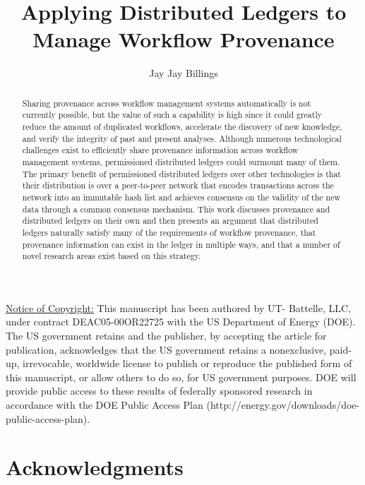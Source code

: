 \documentclass[sigconf]{acmart}
\begin{document}
\title{Applying Distributed Ledgers to Manage Workflow Provenance}

\author{Jay Jay Billings}


\begin{abstract}
Sharing provenance across workflow management systems automatically is not
currently possible, but the value of such a capability is high since it could
greatly reduce the amount of duplicated workflows, accelerate the discovery of
new knowledge, and verify the integrity of past and present analyses. Although
numerous technological challenges exist to efficiently share provenance
information across workflow management systems, permissioned distributed ledgers
could surmount many of them. The primary benefit of permissioned distributed
ledgers over other technologies is that their distribution is over a
peer-to-peer network that encodes transactions across the network into an
immutable hash list and achieves consensus on the validity of the new data
through a common consensus mechanism. This work discusses provenance and
distributed ledgers on their own and then presents an argument that distributed
ledgers naturally satisfy many of the requirements of workflow provenance, that
provenance information can exist in the ledger in multiple ways, and that a
number of novel research areas exist based on this strategy.
\end{abstract}



\maketitle

\underline{Notice of Copyright:} This manuscript has been authored by UT-
Battelle, LLC, under contract DEAC05-00OR22725 with the US Department of
Energy (DOE). The US government retains and the publisher, by accepting
the article for publication, acknowledges that the US government
retains a nonexclusive, paid-up, irrevocable, worldwide license to publish or
reproduce the published form of this manuscript, or allow others to do so, for
US government purposes. DOE will provide
public access to these results of federally sponsored research in accordance
with the DOE Public Access Plan (http://energy.gov/downloads/doe-public-access-plan).



\section*{Acknowledgments}\label{acknowledgments}




\end{document}

